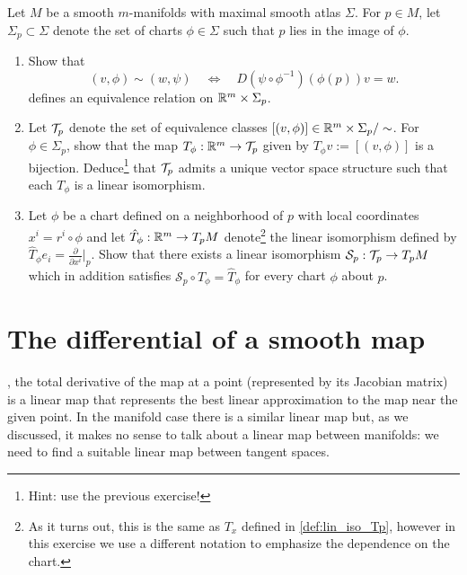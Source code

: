 \begin{exercise}
Let $M$ be a smooth $m$-manifolds with maximal smooth atlas $\Sigma$.
For $p\in M$, let $\Sigma_p \subset \Sigma$ denote the set of charts $\phi\in\Sigma$ such that $p$ lies in the image of $\phi$.
\begin{enumerate}
  \item Show that
  \begin{equation}
    (v,\phi) \sim (w, \psi)
    \quad\Longleftrightarrow\quad
    D(\psi \circ \phi^{-1})(\phi(p))v = w.
  \end{equation}
  defines an equivalence relation on $\mathbb{R}^m\times\Sigma_p$.
  \item Let $\mathcal{T}_p$ denote the set of equivalence classes $[(v,\phi)]\in \mathbb{R}^m\times\Sigma_p/\sim$. For $\phi\in\Sigma_p$, show that the map $T_\phi:\mathbb{R}^m\to\mathcal{T}_p$ given by $T_\phi v := [(v,\phi)]$ is a bijection.
  Deduce\footnote{Hint: use the previous exercise!} that $\mathcal{T}_p$ admits a unique vector space structure such that each $T_\phi$ is a linear isomorphism.
  \item Let $\phi$ be a chart defined on a neighborhood of $p$ with local coordinates $x^i = r^i \circ \phi$ and let $\hat T_\phi :\mathbb{R}^m \to T_pM$ denote\footnote{As it turns out, this is the same as $T_x$ defined in \eqref{def:lin_iso_Tp}, however in this exercise we use a different notation to emphasize the dependence on the chart.} the linear isomorphism defined by $\hat T_\phi e_i = \frac{\partial}{\partial x^i}\big|_p$.
  Show that there exists a linear isomorphism $\mathcal{S}_p:\mathcal{T}_p\to T_pM$ which in addition satisfies $\mathcal{S}_p \circ T_\phi = \hat T_\phi$ for every chart $\phi$ about $p$.
\end{enumerate}
\end{exercise}

\section{The differential of a smooth map}\label{sec:diffsmooth}

, the total derivative of the map at a point (represented by its Jacobian matrix) is a linear map that represents the best linear approximation to the map near the given point.
In the manifold case there is a similar linear map but, as we discussed, it makes no sense to talk about a linear map between manifolds: we need to find a suitable linear map between tangent spaces.

